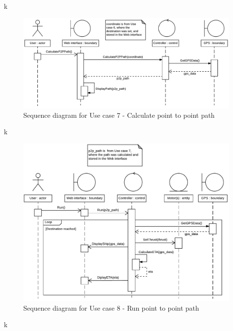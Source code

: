 k

\begin{figure}[H]
	\centering
	\includegraphics[width=1\linewidth]{Images/System_architecture/Use_case_7_SD}
	\caption{Sequence diagram for Use case 7 - Calculate point to point path}
\end{figure}

k

\begin{figure}[H]
	\centering
	\includegraphics[width=1\linewidth]{Images/System_architecture/Use_case_8_SD}
	\caption{Sequence diagram for Use case 8 - Run point to point path}
\end{figure}

k


